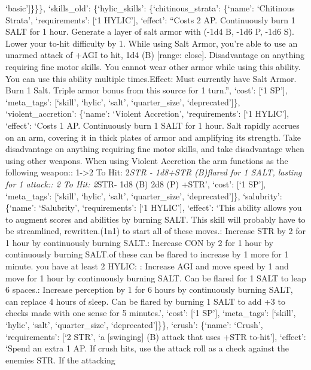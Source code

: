 \documentclass[
  letterpaper,
  DIV=11,
  numbers=noendperiod]{scrartcl}
\begin{document}
`basic'{]}\}\}\}, `skills\_old': \{`hylic\_skills':
\{`chitinous\_strata': \{`name': `Chitinous Strata', `requirements':
{[}`1 HYLIC'{]}, `effect': ``Costs 2 AP. Continuously burn 1 SALT for 1
hour. Generate a layer of salt armor with (-1d4 B, -1d6 P, -1d6 S).
Lower your to-hit difficulty by 1. While using Salt Armor, you're able
to use an unarmed attack of +AGI to hit, 1d4 (B) {[}range: close{]}.
Disadvantage on anything requiring fine motor skills. You cannot wear
other armor while using this ability. You can use this ability multiple
times.\n\nFlare Effect: Must currently have Salt Armor. Burn 1 Salt.
Triple armor bonus from this source for 1 turn.'', `cost': {[}`1 SP'{]},
`meta\_tags': {[}`skill', `hylic', `salt', `quarter\_size',
`deprecated'{]}\}, `violent\_accretion': \{`name': `Violent Accretion',
`requirements': {[}`1 HYLIC'{]}, `effect': `Costs 1 AP. Continuously
burn 1 SALT for 1 hour. Salt rapidly accrues on an arm, covering it in
thick plates of armor and amplifying its strength. Take disadvantage on
anything requiring fine motor skills, and take disadvantage when using
other weapons. When using Violent Accretion the arm functions as the
following weapon:\n\nSpeed: 1-\textgreater2
To Hit: 2\emph{STR \n- 1d8+STR (B)\nIf flared for 1 SALT, lasting for 1
attack:\nSpeed: 2 To Hit: 2}STR\n- 1d8 (B) 2d8 (P) +STR',
`cost': {[}`1 SP'{]}, `meta\_tags': {[}`skill', `hylic', `salt',
`quarter\_size', `deprecated'{]}\}, `salubrity': \{`name': `Salubrity',
`requirements': {[}`1 HYLIC'{]}, `effect': `This ability allows you to
augment scores and abilities by burning SALT. This skill will probably
have to be streamlined, rewritten.\n(1n1) to start all of these
moves.\nSTR: Increase STR by 2 for 1 hour by continuously burning
SALT.\nCON: Increase CON by 2 for 1 hour by continuously burning
SALT.\nBoth of these can be flared to increase by 1 more for 1 minute.
\nIf you have at least 2 HYLIC: \nAGI: Increase AGI and move speed by 1
and move for 1 hour by continuously burning SALT. Can be flared for 1
SALT to leap 6 spaces.\nPERCEPTION: Increase perception by 1 for 6 hours
by continuously burning SALT, can replace 4 hours of sleep. Can be
flared by burning 1 SALT to add +3 to checks made with one sense for 5
minutes.', `cost': {[}`1 SP'{]}, `meta\_tags': {[}`skill', `hylic',
`salt', `quarter\_size', `deprecated'{]}\}\}, `crush': \{`name':
`Crush', `requirements': {[}`2 STR', `a {[}swinging{]} (B) attack that
uses +STR to-hit'{]}, `effect': `Spend an extra 1 AP. If crush hits, use
the attack roll as a check against the enemies STR. If the attacking
\end{document}

